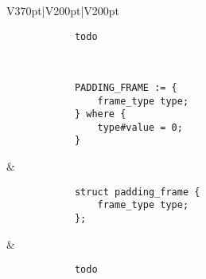 \documentclass[10pt,a4paper,landscape]{article}
\begin{document}
\begin{longtable}{V{370pt}|V{200pt}|V{200pt}}
\begin{verbatim}
			todo
		\end{verbatim}
	\\ \hline
		\begin{verbatim}
			PADDING_FRAME := {
			    frame_type type;
			} where {
			    type#value = 0;
			}
		\end{verbatim}
		& 
		\begin{verbatim}
			struct padding_frame {
			    frame_type type;
			};
		\end{verbatim}
		 &
		\begin{verbatim}
			todo
		\end{verbatim}
	\\
	\bottomrule
	\end{longtable}
\end{document}
